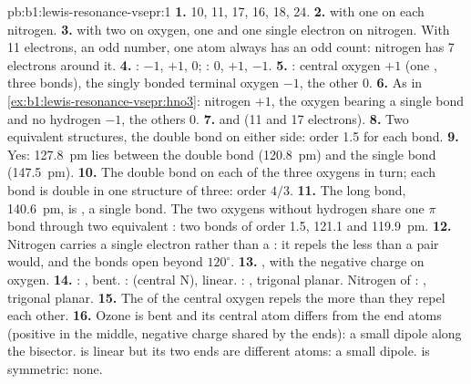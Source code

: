 \begin{solution}{pb:b1:lewis-resonance-vsepr:1}
\textbf{1.}  10,  11,  17,  16,  18,
 24.
\textbf{2.}  with one  on each nitrogen.
\textbf{3.}  with two  on oxygen, one  and one
single electron on nitrogen. With 11 electrons, an odd number, one atom
always has an odd count: nitrogen has 7 electrons around it.
\textbf{4.} : $-1$, $+1$, $0$; : $0$, $+1$, $-1$.
\textbf{5.} : central oxygen $+1$ (one , three bonds),
the singly bonded terminal oxygen $-1$, the other 0.
\textbf{6.} As in \cref{ex:b1:lewis-resonance-vsepr:hno3}: nitrogen $+1$,
the oxygen bearing a single bond and no hydrogen $-1$, the others 0.
\textbf{7.}  and  (11 and 17 electrons).
\textbf{8.} Two equivalent structures, the double bond on either side:
order 1.5 for each bond.
\textbf{9.} Yes: \qty{127.8}{pm} lies between the double bond
(\qty{120.8}{pm}) and the single bond (\qty{147.5}{pm}).
\textbf{10.} The double bond on each of the three oxygens in turn; each
 bond is double in one structure of three: order $4/3$.
\textbf{11.} The long bond, \qty{140.6}{pm}, is , a single bond.
The two oxygens without hydrogen share one $\pi$ bond through two
equivalent : two bonds of order 1.5, 121.1 and
\qty{119.9}{pm}.
\textbf{12.} Nitrogen carries a single electron rather than a :
it repels the  less than a pair would, and the bonds open
beyond $120^\circ$.
\textbf{13.} , with the negative charge on oxygen.
\textbf{14.} : , bent. :  (central N),
linear. : , trigonal planar. Nitrogen of :
, trigonal planar.
\textbf{15.} The  of the central oxygen repels the 
more than they repel each other.
\textbf{16.} Ozone is bent and its central atom differs from the end
atoms (positive  in the middle, negative charge shared by
the ends): a small dipole along the bisector.  is linear but its
two ends are different atoms: a small dipole.  is symmetric: none.

\end{solution}
